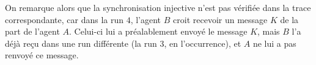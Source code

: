 \documentclass[a4paper,10pt]{article}
\begin{document}
On remarque alors que la synchronisation injective n'est pas vérifiée dans la trace correspondante, car dans la run $4$, l'agent $B$ croit recevoir un message $K$ de la part de l'agent $A$. Celui-ci lui a préalablement envoyé le message $K$, mais $B$ l'a déjà reçu dans une run différente (la run $3$, en l'occurrence), et $A$ ne lui a pas renvoyé ce message.



\end{document}
